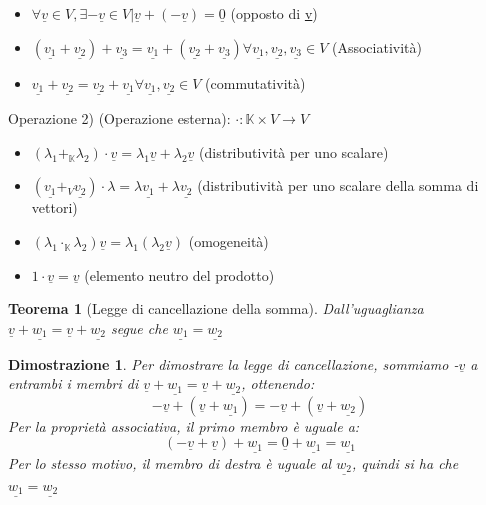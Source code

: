 \documentclass[12pt]{article}
\newenvironment{para}{\begin{adjustwidth}{13mm}{}}{\end{adjustwidth}}
\newtheorem{Teorema}{Teorema}[subsection]
\newtheorem{Dimostrazione}{Dimostrazione}[subsection]
\begin{document}
\begin{para}
\begin{itemize}
  \item $\forall \underline{v} \in V, \exists -\underline{v} \in V | \underline{v} + (-\underline{v}) = \underline{0}$ (opposto di \underline{v})
  \item $(\underline{v_1} + \underline{v_2})+\underline{v_3} = \underline{v_1}+(\underline{v_2}+\underline{v_3}) \forall \underline{v_1}, \underline{v_2 },\underline{v_3} \in V$ (Associatività)
  \item $\underline{v_1} + \underline{v_2} = \underline{v_2} + \underline{v_1} \forall \underline{v_1}, \underline{v_2} \in V$ (commutatività)
\end{itemize}
Operazione 2) (Operazione esterna): $\cdot : \mathbb{K}\times V \rightarrow V$
\begin{itemize}
  \item $(\lambda_1 +_\mathbb{K} \lambda_2) \cdot \underline{v} = \lambda_1 \underline{v} + \lambda_2 \underline{v} $ (distributività per uno scalare)
  \item $(\underline{v_1} +_V \underline{v_2})\cdot \lambda = \lambda \underline{v_1} + \lambda \underline{v_2}$ (distributività per uno scalare della somma di vettori)
  \item $(\lambda_1 \cdot_\mathbb{K} \lambda_2)\underline{v} = \lambda_1(\lambda_2\underline{v})$ (omogeneità)
  \item $1 \cdot \underline{v} = \underline{v}$ (elemento neutro del prodotto)
\end{itemize}

\begin{Teorema}[Legge di cancellazione della somma]
Dall'uguaglianza \newline $\underline{v}+\underline{w_1} = \underline{v}+\underline{w_2}$ segue che $\underline{w_1} = \underline{w_2}$
\end{Teorema}

\begin{Dimostrazione}
Per dimostrare la legge di cancellazione, sommiamo -$\underline{v}$ a entrambi i membri di $\underline{v}+\underline{w_1} = \underline{v}+\underline{w_2}$, ottenendo: \newline
$$-\underline{v} + (\underline{v}+\underline{w_1}) = -\underline{v} + (\underline{v}+\underline{w_2})$$
Per la proprietà associativa, il primo membro è uguale a:
$$(-\underline{v}+\underline{v})+\underline{w_1} = \underline{0}+\underline{w_1}=\underline{w_1}$$
Per lo stesso motivo, il membro di destra è uguale al $\underline{w_2}$, quindi si ha che $\underline{w_1} = \underline{w_2}$
\end{Dimostrazione}


\end{para}
\end{document}
